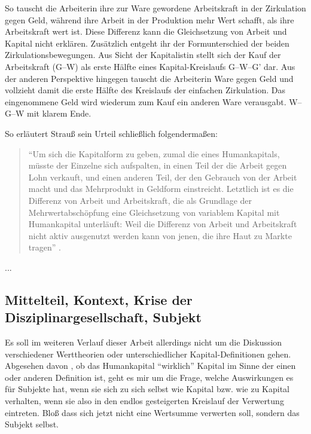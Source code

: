 \documentclass[12pt,
               DIV13,
               paper=a4,
               twoside=false,
               onehalfspacing,
               bibliography=totoc,
               toc=graduated,
               draft,
               ]{scrartcl}
\newcommand{\pc}[2]{\parencite[#1]{#2}}
\newcommand{\worries}[1]{\ifdraft{\textcolor{blue}{\texttt{(#1)}}}{}}
\newcommand{\gwg}{G--W--G'\xspace}
\newcommand{\wgw}{W--G--W\xspace}
\begin{document}
So tauscht die Arbeiterin ihre zur Ware gewordene Arbeitskraft in der
Zirkulation gegen Geld, während ihre Arbeit in der Produktion mehr
Wert schafft, als ihre Arbeitskraft wert ist. Diese Differenz kann die
Gleichsetzung von Arbeit und Kapital nicht erklären. Zusätzlich
entgeht ihr der Formunterschied der beiden Zirkulationsbewegungen. Aus
Sicht der Kapitalistin stellt sich der Kauf der Arbeitskraft (G--W)
als erste Hälfte eines Kapital-Kreislaufs \gwg dar. Aus der anderen
Perspektive hingegen tauscht die Arbeiterin Ware gegen Geld und
vollzieht damit die erste Hälfte des Kreislaufs der einfachen
Zirkulation. Das eingenommene Geld wird wiederum zum Kauf ein anderen
Ware verausgabt. \wgw mit klarem Ende.

So erläutert Strauß sein Urteil schließlich folgendermaßen:

\begin{spacing}{1}
\begin{quote}
"`Um sich die Kapitalform zu geben, zumal die eines Humankapitals,
müsste der Einzelne sich aufspalten, in einen Teil der die Arbeit
gegen Lohn verkauft, und einen anderen Teil, der den Gebrauch von der
Arbeit macht und das Mehrprodukt in Geldform einstreicht.
Letztlich ist es die Differenz von Arbeit und Arbeitskraft, die als
Grundlage der Mehrwertabschöpfung eine Gleichsetzung von variablem
Kapital mit Humankapital unterläuft: Weil die Differenz von Arbeit und
Arbeitskraft nicht aktiv ausgenutzt werden kann von jenen, die ihre
Haut zu Markte tragen"' \pc{126}{strauss}.
\end{quote}
\end{spacing}

...

\subsection{Mittelteil, Kontext, Krise der Disziplinargesellschaft,
Subjekt}

Es soll im weiteren Verlauf dieser Arbeit allerdings nicht um die
Diskussion verschiedener Werttheorien oder unterschiedlicher
Kapital-Definitionen gehen. Abgesehen davon \worries{?}, ob das
Humankapital "`wirklich"' Kapital  im Sinne der einen oder anderen
Definition ist, geht es mir um die Frage, welche Auswirkungen es für
Subjekte hat, wenn sie sich zu sich selbst wie Kapital bzw. wie zu
Kapital verhalten, wenn sie also in den endlos gesteigerten Kreislauf
der Verwertung eintreten. Bloß dass sich jetzt nicht eine Wertsumme
verwerten soll, sondern das Subjekt selbst.
\end{document}
